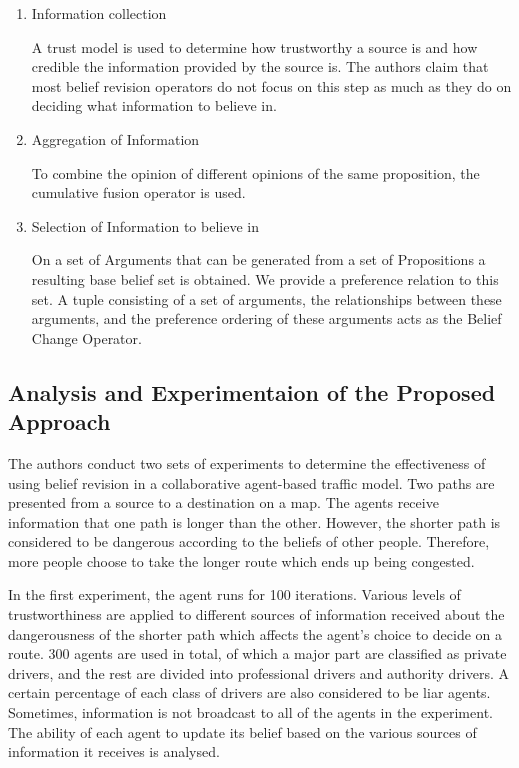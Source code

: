 \documentclass[UTF8]{article}
\begin{document}
\begin{enumerate}
  \item Information collection
  
  A trust model is used to determine how trustworthy a source is and how credible the information provided by the source is. The authors claim that 
    most belief revision operators do not focus on this step as much as they do on deciding what information to believe in.

  
  \item Aggregation of Information
  
  To combine the opinion of different opinions of the same proposition, the cumulative fusion operator
  is used.

  \item Selection of Information to believe in
  
  On a set of Arguments that can be generated from a set of Propositions a resulting base belief set is obtained. We provide a 
  preference relation to this set. A tuple consisting of a set of arguments, the relationships between these arguments, and the preference ordering 
  of these arguments acts as the Belief Change Operator.

  
\end{enumerate}

\subsection{Analysis and Experimentaion of the Proposed Approach}
The authors conduct two sets of experiments to determine the effectiveness of using belief revision
in a collaborative agent-based traffic model. Two paths are presented from a source to a destination 
on a map. The agents receive information that one path is longer than the other. However, the shorter 
path is considered to be dangerous according to the beliefs of other people. Therefore, more people choose to
take the longer route which ends up being congested. 

In the first experiment, the agent runs for 100 iterations. Various levels of trustworthiness are applied to different sources
of information received about the dangerousness of the shorter path which affects the agent's choice to 
decide on a route. 300 agents are used in total, of which a major part are classified as private drivers, 
and the rest are divided into professional drivers and authority drivers. A certain percentage of each class 
of drivers are also considered to be liar agents. Sometimes, information is not broadcast to all of the agents in the experiment. The ability of each agent to update its belief based on the 
various sources of information it receives is analysed.
\end{document}
